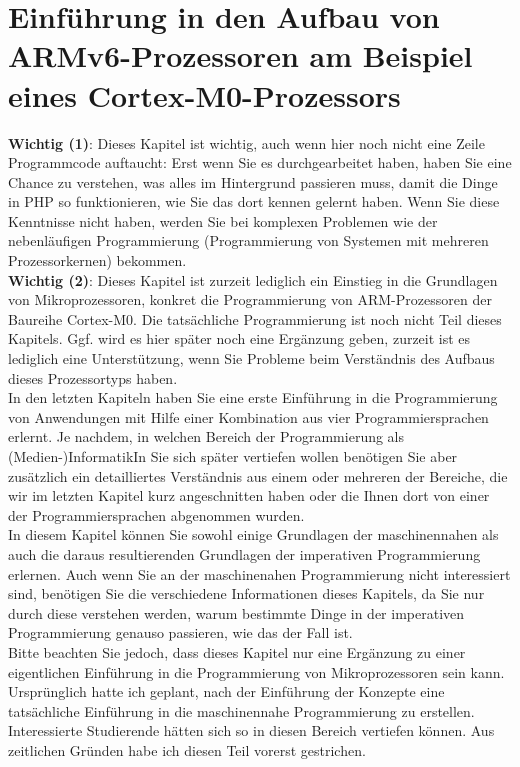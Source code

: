 \chapter{Einführung in den Aufbau von ARMv6-Prozessoren am Beispiel eines Cortex-M0-Prozessors}

\textbf{Wichtig (1)}: Dieses Kapitel ist wichtig, auch wenn hier noch nicht eine Zeile Programmcode auftaucht: Erst wenn Sie es durchgearbeitet haben, haben Sie eine Chance zu verstehen, was alles im Hintergrund passieren muss, damit die Dinge in PHP so funktionieren, wie Sie das dort kennen gelernt haben. Wenn Sie diese Kenntnisse nicht haben, werden Sie bei komplexen Problemen wie der nebenläufigen Programmierung (Programmierung von Systemen mit mehreren Prozessorkernen) bekommen.\\

\textbf{Wichtig (2)}: Dieses Kapitel ist zurzeit lediglich ein Einstieg in die Grundlagen  von Mikroprozessoren, konkret die Programmierung von ARM-Prozessoren der Baureihe Cortex-M0. Die tatsächliche Programmierung ist noch nicht Teil dieses Kapitels. Ggf. wird es hier später noch eine Ergänzung geben, zurzeit ist es lediglich eine Unterstützung, wenn Sie Probleme beim Verständnis des Aufbaus dieses Prozessortyps haben.\\

In den letzten Kapiteln haben Sie eine erste Einführung in die Programmierung von Anwendungen mit Hilfe einer Kombination aus vier Programmiersprachen erlernt. Je nachdem, in welchen Bereich der Programmierung als (Medien-)InformatikIn Sie sich später vertiefen wollen benötigen Sie aber zusätzlich ein detailliertes Verständnis aus einem oder mehreren der Bereiche, die wir im letzten Kapitel kurz angeschnitten haben oder die Ihnen dort von einer der Programmiersprachen abgenommen wurden.\\

In diesem Kapitel können Sie sowohl einige Grundlagen der maschinennahen als auch die daraus resultierenden Grundlagen der imperativen Programmierung erlernen. Auch wenn Sie an der maschinenahen Programmierung nicht interessiert sind, benötigen Sie die verschiedene Informationen dieses Kapitels, da Sie nur durch diese verstehen werden, warum bestimmte Dinge in der imperativen Programmierung genauso passieren, wie das der Fall ist. \\

Bitte beachten Sie jedoch, dass dieses Kapitel nur eine Ergänzung zu einer eigentlichen Einführung in die Programmierung von Mikroprozessoren sein kann. Ursprünglich hatte ich geplant, nach der Einführung der Konzepte eine tatsächliche Einführung in die maschinennahe Programmierung zu erstellen. Interessierte Studierende hätten sich so in diesen Bereich vertiefen können. Aus zeitlichen Gründen habe ich diesen Teil vorerst gestrichen.\\

